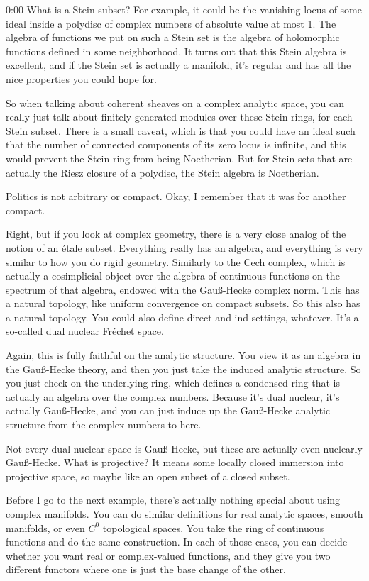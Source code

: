 \begin{unfinished}{0:00}
What is a Stein subset? For example, it could be the vanishing locus of some ideal inside a polydisc of complex numbers of absolute value at most 1. The algebra of functions we put on such a Stein set is the algebra of holomorphic functions defined in some neighborhood. It turns out that this Stein algebra is excellent, and if the Stein set is actually a manifold, it's regular and has all the nice properties you could hope for.

So when talking about coherent sheaves on a complex analytic space, you can really just talk about finitely generated modules over these Stein rings, for each Stein subset. There is a small caveat, which is that you could have an ideal such that the number of connected components of its zero locus is infinite, and this would prevent the Stein ring from being Noetherian. But for Stein sets that are actually the Riesz closure of a polydisc, the Stein algebra is Noetherian.

Politics is not arbitrary or compact. Okay, I remember that it was for another compact. 

Right, but if you look at complex geometry, there is a very close analog of the notion of an étale subset. Everything really has an algebra, and everything is very similar to how you do rigid geometry. Similarly to the Cech complex, which is actually a cosimplicial object over the algebra of continuous functions on the spectrum of that algebra, endowed with the Gauß-Hecke complex norm. This has a natural topology, like uniform convergence on compact subsets. So this also has a natural topology. You could also define direct and ind settings, whatever. It's a so-called dual nuclear Fréchet space.

Again, this is fully faithful on the analytic structure. You view it as an algebra in the Gauß-Hecke theory, and then you just take the induced analytic structure. So you just check on the underlying ring, which defines a condensed ring that is actually an algebra over the complex numbers. Because it's dual nuclear, it's actually Gauß-Hecke, and you can just induce up the Gauß-Hecke analytic structure from the complex numbers to here.

Not every dual nuclear space is Gauß-Hecke, but these are actually even nuclearly Gauß-Hecke. What is projective? It means some locally closed immersion into projective space, so maybe like an open subset of a closed subset.

Before I go to the next example, there's actually nothing special about using complex manifolds. You can do similar definitions for real analytic spaces, smooth manifolds, or even $C^0$ topological spaces. You take the ring of continuous functions and do the same construction. In each of those cases, you can decide whether you want real or complex-valued functions, and they give you two different functors where one is just the base change of the other.


\end{unfinished}
